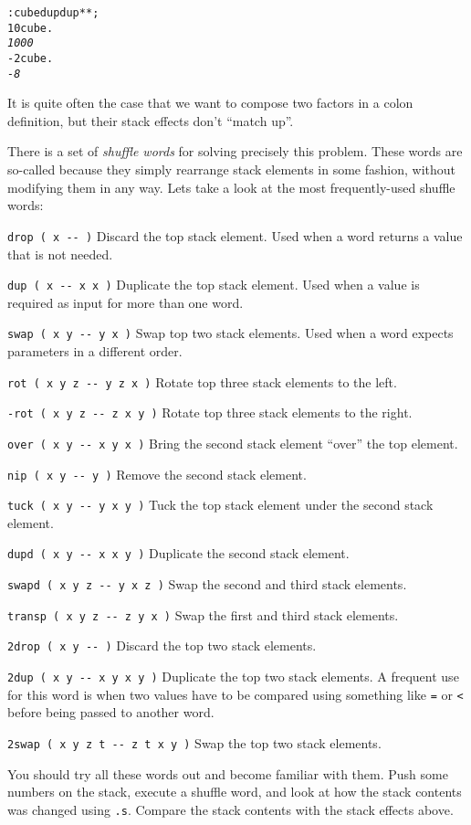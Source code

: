 \documentclass[english]{article}
\begin{document}
\begin{alltt}
: cube dup dup {*} {*} ;
10 cube .
\emph{1000}
-2 cube .
\emph{-8}
\end{alltt}
It is quite often the case that we want to compose two factors in
a colon definition, but their stack effects don't {}``match up''.

There is a set of \emph{shuffle words} for solving precisely this
problem. These words are so-called because they simply rearrange stack
elements in some fashion, without modifying them in any way. Lets
take a look at the most frequently-used shuffle words:

\texttt{drop ( x -{}- )} Discard the top stack element. Used when
a word returns a value that is not needed.

\texttt{dup ( x -{}- x x )} Duplicate the top stack element. Used
when a value is required as input for more than one word.

\texttt{swap ( x y -{}- y x )} Swap top two stack elements. Used when
a word expects parameters in a different order.

\texttt{rot ( x y z -{}- y z x )} Rotate top three stack elements
to the left.

\texttt{-rot ( x y z -{}- z x y )} Rotate top three stack elements
to the right.

\texttt{over ( x y -{}- x y x )} Bring the second stack element {}``over''
the top element.

\texttt{nip ( x y -{}- y )} Remove the second stack element.

\texttt{tuck ( x y -{}- y x y )} Tuck the top stack element under
the second stack element.

\texttt{dupd ( x y -{}- x x y )} Duplicate the second stack element.

\texttt{swapd ( x y z -{}- y x z )} Swap the second and third stack elements.

\texttt{transp ( x y z -{}- z y x )} Swap the first and third stack elements.

\texttt{2drop ( x y -{}- )} Discard the top two stack elements.

\texttt{2dup ( x y -{}- x y x y )} Duplicate the top two stack elements. A frequent use for this word is when two values have to be compared using something like \texttt{=} or \texttt{<} before being passed to another word.

\texttt{2swap ( x y z t -{}- z t x y )} Swap the top two stack elements.

You should try all these words out and become familiar with them. Push some numbers on the stack,
execute a shuffle word, and look at how the stack contents was changed using
\texttt{.s}. Compare the stack contents with the stack effects above.
\end{document}
